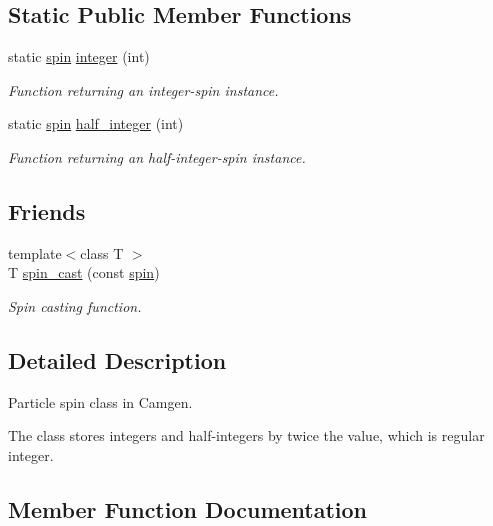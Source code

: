 \subsection*{Static Public Member Functions}
\begin{DoxyCompactItemize}
\item 
\hypertarget{a00514_a0e5f5225bd6ca5ec2bbf8c0719647159}{}static \hyperlink{a00514}{spin} \hyperlink{a00514_a0e5f5225bd6ca5ec2bbf8c0719647159}{integer} (int)\label{a00514_a0e5f5225bd6ca5ec2bbf8c0719647159}

\begin{DoxyCompactList}\small\item\em Function returning an integer-\/spin instance. \end{DoxyCompactList}\item 
static \hyperlink{a00514}{spin} \hyperlink{a00514_a40589d046e20aac5764095a7d0b0cfdf}{half\+\_\+integer} (int)
\begin{DoxyCompactList}\small\item\em Function returning an half-\/integer-\/spin instance. \end{DoxyCompactList}\end{DoxyCompactItemize}
\subsection*{Friends}
\begin{DoxyCompactItemize}
\item 
\hypertarget{a00514_a53097258d49559d28f326539ead5dbf8}{}{\footnotesize template$<$class T $>$ }\\T \hyperlink{a00514_a53097258d49559d28f326539ead5dbf8}{spin\+\_\+cast} (const \hyperlink{a00514}{spin})\label{a00514_a53097258d49559d28f326539ead5dbf8}

\begin{DoxyCompactList}\small\item\em Spin casting function. \end{DoxyCompactList}\end{DoxyCompactItemize}


\subsection{Detailed Description}
Particle spin class in Camgen. 

The class stores integers and half-\/integers by twice the value, which is regular integer. 

\subsection{Member Function Documentation}
\hypertarget{a00514_a40589d046e20aac5764095a7d0b0cfdf}{}
